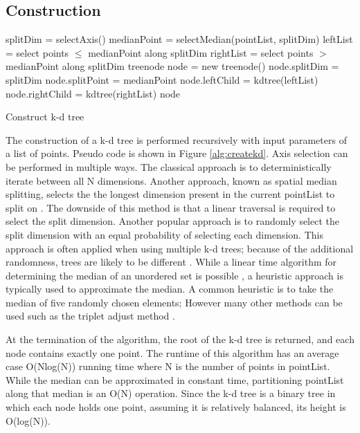 \subsection{Construction}
\label{subsec:const}

\begin{algorithm}
\begin{algorithmic}
	\State splitDim = selectAxis()
	\State
	\State medianPoint = selectMedian(pointList, splitDim)
	\State leftList = select points $\leq$ medianPoint along splitDim
	\State rightList = select points $>$ medianPoint along splitDim
	\State
	\State treenode node = new treenode()
	\State node.splitDim = splitDim
	\State node.splitPoint = medianPoint
	\State node.leftChild = kdtree(leftList)
	\State node.rightChild = kdtree(rightList)
	\State
	\State \Return node
\EndFunction
\end{algorithmic}
\caption{Construct k-d tree}
\label{alg:createkd}
\end{algorithm}

The construction of a k-d tree is performed recursively with input parameters of a list of points.  Pseudo code is shown in Figure \ref{alg:createkd}.  Axis selection can be performed in multiple ways.  The classical approach is to deterministically iterate between all N dimensions.  Another approach, known as spatial median splitting, selects the the longest dimension present in the current pointList to split on \citep{zhou2008real}.  The downside of this method is that a linear traversal is required to select the split dimension.  Another popular approach is to randomly select the split dimension with an equal probability of selecting each dimension.  This approach is often applied when using multiple k-d trees; because of the additional randomness, trees are likely to be different \citep{flann_pami_2014}.  While a linear time algorithm for determining the median of an unordered set is possible \citep{megiddo1984linear}, a heuristic approach is typically used to approximate the median.  A common heuristic is to take the median of five randomly chosen elements; However many other methods can be used such as the triplet adjust method \citep{battiato2000efficient}.

At the termination of the algorithm, the root of the k-d tree is returned, and each node contains exactly one point.  The runtime of this algorithm has an average case O(Nlog(N)) running time where N is the number of points in pointList.  While the median can be approximated in constant time, partitioning pointList along that median is an O(N) operation.  Since the k-d tree is a binary tree in which each node holds one point, assuming it is relatively balanced, its height is O(log(N)).

